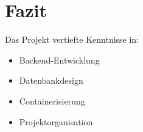 \documentclass[
    12pt,
    a4paper
]{article}
\begin{document}
\newpage
\section{Fazit}

Das Projekt vertiefte Kenntnisse in:
\begin{itemize}
    \item Backend-Entwicklung
    \item Datenbankdesign
    \item Containerisierung
    \item Projektorganisation
\end{itemize}
\end{document}
